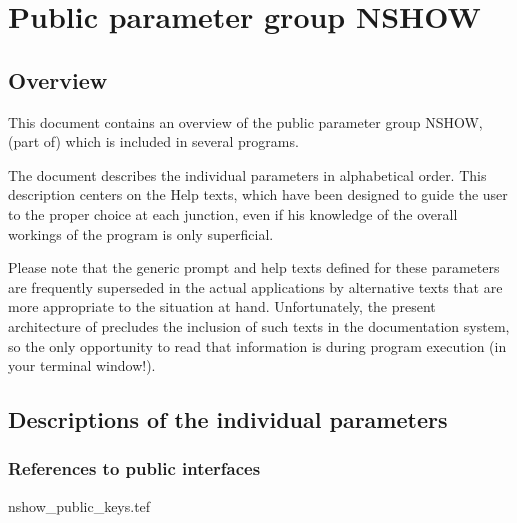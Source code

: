 
\chapter{ Public parameter group NSHOW}
\tableofcontents


\section{ Overview}

	This document contains an overview of the public parameter group NSHOW,
(part of) which is included in several \NEWSTAR programs.



	The
document describes the individual parameters in alphabetical order. This
description centers on the Help texts, which have been designed to guide the
user to the proper choice at each junction, even if his knowledge of the
overall workings of the program is only superficial.

	Please note that the generic prompt and help texts defined for these
parameters are frequently superseded in the actual applications by alternative
texts that are more appropriate to the situation at hand. Unfortunately, the
present architecture of \NEWSTAR precludes the inclusion of such texts in the
documentation system, so the only opportunity to read that information is
during program execution (in your terminal window!).


\section{ Descriptions of the individual parameters}
\label{.descriptions}

\subsection{ References to public interfaces}
\label{.public}

 {nshow_public_keys.tef}
